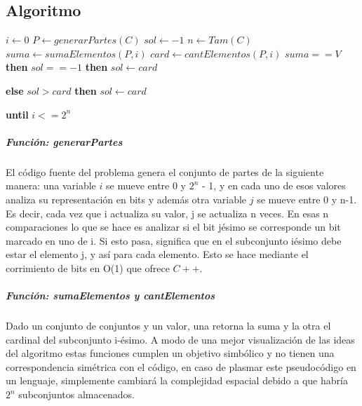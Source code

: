 \documentclass[7pt,a4paper]{article}
\begin{document}
\subsection{Algoritmo}

\renewcommand{\Then}{%
  \textbf{then}\stepcounter{indent} }
\renewcommand{\Else}{%
  \kill\addtocounter{indent}{-1}%
  \liprint\textbf{else}\>\>\stepcounter{indent}}
\renewcommand{\Until}{%
  \addtocounter{indent}{-1}%
  \kill\liprint\textbf{until} }

\begin{codebox}
  \li $i \gets 0$
  \li $P \gets generarPartes(C)$
  \li $sol \gets -1$
  \li $n \gets Tam(C)$
  \li \Repeat
  \li   $suma \gets sumaElementos(P, i)$
  \li   $card \gets cantElementos(P, i)$
  \li   \If $suma == V$ \Then
  \li 	\If $sol == -1$ \Then
  \li     $sol \gets card$
  \li 	\Else 
  \li 	\If $sol > card$ \Then
  \li 	$sol \gets card$
  		\End
        \End
        \End
  \li \Until $i <= 2^{n}$
\end{codebox}


\subparagraph{Función: generarPartes} El código fuente del problema genera el conjunto de partes de la siguiente manera: una variable $i$ se mueve entre 0 y $2^{n}$ - 1, y en cada uno de esos valores analiza su representación en bits y además otra variable $j$ se mueve entre 0 y n-1. Es decir, cada vez que i actualiza su valor, j se actualiza n veces. En esas n comparaciones lo que se hace es analizar si el bit jésimo se corresponde un bit marcado en uno de i. Si esto pasa, significa que en el subconjunto iésimo debe estar el elemento j, y así para cada elemento. Esto se hace mediante el corrimiento de bits en O(1) que ofrece $C++$.
\subparagraph{Función: sumaElementos y cantElementos} Dado un conjunto de conjuntos y un valor,  una retorna la suma y la otra el cardinal del subconjunto i-ésimo. A modo de una mejor visualización de las ideas del algoritmo estas funciones cumplen un objetivo simbólico y no tienen una correspondencia simétrica con el código, en caso de plasmar este pseudocódigo en un lenguaje, simplemente cambiará la complejidad espacial debido a que habría $2^{n}$ subconjuntos almacenados.
\end{document}
